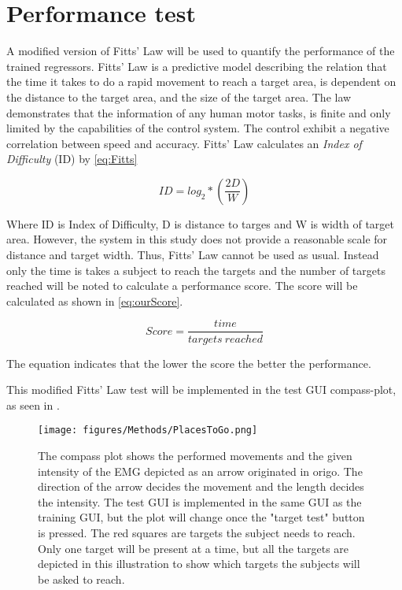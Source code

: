 \section{Performance test}

A modified version of Fitts' Law will be used to quantify the performance of the trained regressors. Fitts' Law is a predictive model describing the relation that the time it takes to do a rapid movement to reach a target area, is dependent on the distance to the target area, and the size of the target area. The law demonstrates that the information of any human motor tasks, is finite and only limited by the capabilities of the control system. The control exhibit a negative correlation between speed and accuracy. \cite{Kamavuako2014}
Fitts' Law calculates an \textit{Index of Difficulty} (ID) by \eqref{eq:Fitts}

\begin{equation} \label{eq:Fitts}
ID = log_{2} * (\frac{2D}{W})
\end{equation}

Where ID is Index of Difficulty, D is distance to targes and W is width of target area. However, the system in this study does not provide a reasonable scale for distance and target width. Thus, Fitts' Law cannot be used as usual. Instead only the time is takes a subject to reach the targets and the number of targets reached will be noted to calculate a performance score. The score will be calculated as shown in \eqref{eq:ourScore}.

\begin{equation} \label{eq:ourScore}
	Score = \frac{time}{targets\ reached}
\end{equation}

The equation indicates that the lower the score the better the performance.

This modified Fitts' Law test will be implemented in the test GUI compass-plot, as seen in . 

\begin{figure}[H]
	\texttt{[image: figures/Methods/PlacesToGo.png]}  %
	\caption{The compass plot shows the performed movements and the given intensity of the EMG depicted as an arrow originated in origo. The direction of the arrow decides the movement and the length decides the intensity. The test GUI is implemented in the same GUI as the training GUI, but the plot will change once the "target test" button is pressed. The red squares are targets the subject needs to reach. Only one target will be present at a time, but all the targets are depicted in this illustration to show which targets the subjects will be asked to reach.}
	\label{fig:PlacesToGo}
\end{figure}

